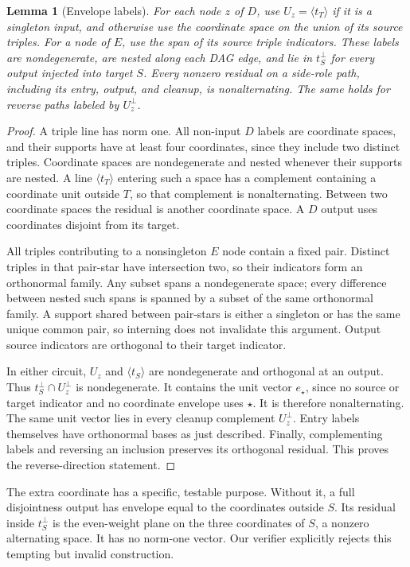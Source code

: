 \documentclass[11pt]{article}
\newtheorem{lemma}{Lemma}
\begin{document}
\begin{lemma}[Envelope labels]
For each node $z$ of $D$, use $U_z=\langle t_T\rangle$ if it is a singleton
input, and otherwise use the coordinate space on the union of its source
triples. For a node of $E$, use the span of its source triple indicators.
These labels are nondegenerate, are nested along each DAG edge, and lie in
$t_S^\perp$ for every output injected into target $S$. Every nonzero residual
on a side-role path, including its entry, output, and cleanup, is
nonalternating. The same holds for reverse paths labeled by $U_z^\perp$.
\end{lemma}
\begin{proof}
A triple line has norm one. All non-input $D$ labels are coordinate spaces,
and their supports have at least four coordinates, since they include two
distinct triples. Coordinate spaces are nondegenerate and nested whenever
their supports are nested. A line $\langle t_T\rangle$ entering such a space
has a complement containing a coordinate unit outside $T$, so that complement
is nonalternating. Between two coordinate spaces the residual is another
coordinate space. A $D$ output uses coordinates disjoint from its target.

All triples contributing to a nonsingleton $E$ node contain a fixed pair.
Distinct triples in that pair-star have intersection two, so their indicators
form an orthonormal family. Any subset spans a nondegenerate space; every
difference between nested such spans is spanned by a subset of the same
orthonormal family. A support shared between pair-stars is either a singleton
or has the same unique common pair, so interning does not invalidate this
argument. Output source indicators are orthogonal to their target indicator.

In either circuit, $U_z$ and $\langle t_S\rangle$ are nondegenerate and
orthogonal at an output. Thus
$t_S^\perp\cap U_z^\perp$ is nondegenerate. It contains the unit vector
$e_\star$, since no source or target indicator and no coordinate envelope
uses $\star$. It is therefore nonalternating. The same unit vector lies
in every cleanup complement $U_z^\perp$. Entry labels themselves have
orthonormal bases as just described. Finally, complementing labels and
reversing an inclusion preserves its orthogonal residual. This proves the
reverse-direction statement.
\end{proof}

The extra coordinate has a specific, testable purpose. Without it, a full
disjointness output has envelope equal to the coordinates outside $S$.
Its residual inside $t_S^\perp$ is the even-weight plane on the three
coordinates of $S$, a nonzero alternating space. It has no norm-one vector.
Our verifier explicitly rejects this tempting but invalid construction.
\end{document}
